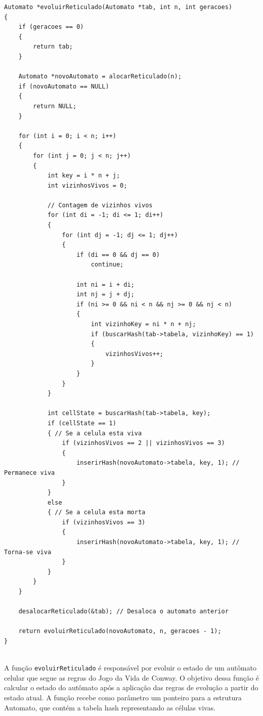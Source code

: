 \documentclass{article}
\begin{document}
\begin{lstlisting}[caption={},label={lst:cod1},language={[x86masm]Assembler}]
Automato *evoluirReticulado(Automato *tab, int n, int geracoes)
{
    if (geracoes == 0)
    {
        return tab;
    }

    Automato *novoAutomato = alocarReticulado(n);
    if (novoAutomato == NULL)
    {
        return NULL;
    }

    for (int i = 0; i < n; i++)
    {
        for (int j = 0; j < n; j++)
        {
            int key = i * n + j;
            int vizinhosVivos = 0;

            // Contagem de vizinhos vivos
            for (int di = -1; di <= 1; di++)
            {
                for (int dj = -1; dj <= 1; dj++)
                {
                    if (di == 0 && dj == 0)
                        continue;

                    int ni = i + di;
                    int nj = j + dj;
                    if (ni >= 0 && ni < n && nj >= 0 && nj < n)
                    {
                        int vizinhoKey = ni * n + nj;
                        if (buscarHash(tab->tabela, vizinhoKey) == 1)
                        {
                            vizinhosVivos++;
                        }
                    }
                }
            }

            int cellState = buscarHash(tab->tabela, key);
            if (cellState == 1)
            { // Se a celula esta viva
                if (vizinhosVivos == 2 || vizinhosVivos == 3)
                {
                    inserirHash(novoAutomato->tabela, key, 1); // Permanece viva
                }
            }
            else
            { // Se a celula esta morta
                if (vizinhosVivos == 3)
                {
                    inserirHash(novoAutomato->tabela, key, 1); // Torna-se viva
                }
            }
        }
    }

    desalocarReticulado(&tab); // Desaloca o automato anterior
    
    return evoluirReticulado(novoAutomato, n, geracoes - 1);
}


 \end{lstlisting}

 \par A função \verb|evoluirReticulado| é responsável por evoluir o estado de um autômato celular que segue as regras do Jogo da Vida de Conway. O objetivo dessa função é calcular o estado do autômato após a aplicação das regras de evolução a partir do estado atual. A função recebe como parâmetro um ponteiro para a estrutura Automato, que contém a tabela hash representando as células vivas.
\end{document}
